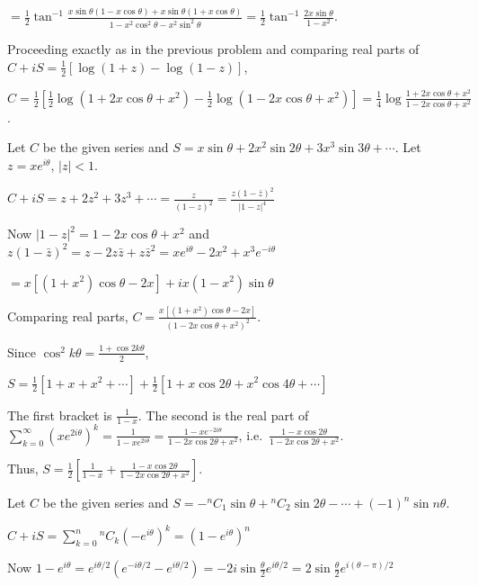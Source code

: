   $= \frac{1}{2}\tan^{-1}\frac{x\sin\theta(1 - x\cos\theta) + x\sin\theta(1 + x\cos\theta)}{1 -
    x^2\cos^2\theta - x^2\sin^2\theta} = \frac{1}{2}\tan^{-1}\frac{2x\sin\theta}{1 - x^2}$.
\item Proceeding exactly as in the previous problem and comparing real parts of $C + iS = \frac{1}{2}[\log(1 +
  z) - \log(1 - z)]$,

  $C = \frac{1}{2}\left[\frac{1}{2}\log\left(1 + 2x\cos\theta + x^2\right) - \frac{1}{2}\log\left(1 -
    2x\cos\theta + x^2\right)\right] = \frac{1}{4}\log\frac{1 + 2x\cos\theta + x^2}{1 - 2x\cos\theta + x^2}$.
\item Let $C$ be the given series and $S = x\sin\theta + 2x^2\sin2\theta + 3x^3\sin3\theta + \cdots$. Let $z
  = xe^{i\theta}$, $|z| < 1$.

  $C + iS = z + 2z^2 + 3z^3 + \cdots = \frac{z}{(1 - z)^2} = \frac{z\left(1 - \bar{z}\right)^2}{|1 - z|^4}$

  Now $|1 - z|^2 = 1 - 2x\cos\theta + x^2$ and $z\left(1 - \bar{z}\right)^2 = z - 2z\bar{z} + z\bar{z}^2 =
  xe^{i\theta} - 2x^2 + x^3e^{-i\theta}$

  $= x\left[(1 + x^2)\cos\theta - 2x\right] + ix\left(1 - x^2\right)\sin\theta$

  Comparing real parts, $C = \frac{x\left[(1 + x^2)\cos\theta - 2x\right]}{\left(1 - 2x\cos\theta +
    x^2\right)^2}$.
\item Since $\cos^2k\theta = \frac{1 + \cos2k\theta}{2}$,

  $S = \frac{1}{2}\left[1 + x + x^2 + \cdots\right] + \frac{1}{2}\left[1 + x\cos2\theta + x^2\cos4\theta +
  \cdots\right]$

  The first bracket is $\frac{1}{1 - x}$. The second is the real part of $\displaystyle\sum_{k =
    0}^\infty\left(xe^{2i\theta}\right)^k = \frac{1}{1 - xe^{2i\theta}} = \frac{1 - xe^{-2i\theta}}{1 -
    2x\cos2\theta + x^2}$, i.e.\ $\frac{1 - x\cos2\theta}{1 - 2x\cos2\theta + x^2}$.

  Thus, $S = \frac{1}{2}\left[\frac{1}{1 - x} + \frac{1 - x\cos2\theta}{1 - 2x\cos2\theta + x^2}\right]$.
\item Let $C$ be the given series and $S = -{}^nC_1\sin\theta + {}^nC_2\sin2\theta - \cdots + (-1)^n\sin
  n\theta$.

  $C + iS = \displaystyle\sum_{k = 0}^n{}^nC_k\left(-e^{i\theta}\right)^k = \left(1 - e^{i\theta}\right)^n$

  Now $1 - e^{i\theta} = e^{i\theta/2}\left(e^{-i\theta/2} - e^{i\theta/2}\right) =
  -2i\sin\frac{\theta}{2}e^{i\theta/2} = 2\sin\frac{\theta}{2}e^{i(\theta - \pi)/2}$

